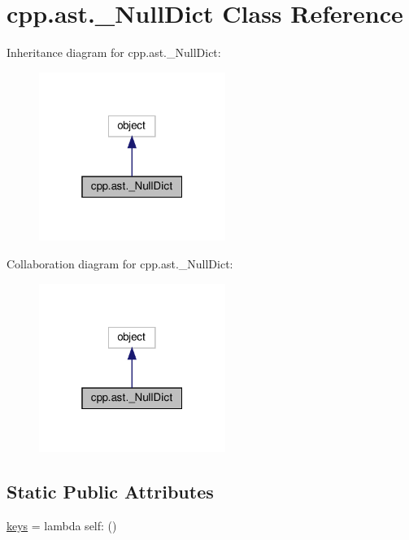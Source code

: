 \hypertarget{classcpp_1_1ast_1_1___null_dict}{}\section{cpp.\+ast.\+\_\+\+Null\+Dict Class Reference}
\label{classcpp_1_1ast_1_1___null_dict}


Inheritance diagram for cpp.\+ast.\+\_\+\+Null\+Dict\+:
\nopagebreak
\begin{figure}[H]
\begin{center}
\leavevmode
\includegraphics[width=172pt]{classcpp_1_1ast_1_1___null_dict__inherit__graph}
\end{center}
\end{figure}


Collaboration diagram for cpp.\+ast.\+\_\+\+Null\+Dict\+:
\nopagebreak
\begin{figure}[H]
\begin{center}
\leavevmode
\includegraphics[width=172pt]{classcpp_1_1ast_1_1___null_dict__coll__graph}
\end{center}
\end{figure}
\subsection*{Static Public Attributes}
\begin{DoxyCompactItemize}
\item 
\hyperlink{classcpp_1_1ast_1_1___null_dict_abb0b7884aa59bede0a8503dffcd1733f}{keys} = lambda self\+: ()
\end{DoxyCompactItemize}


